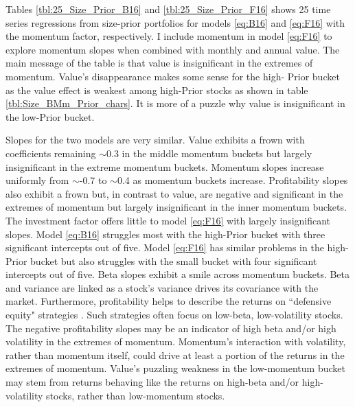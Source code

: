 
Tables \ref{tbl:25_Size_Prior_B16} and \ref{tbl:25_Size_Prior_F16} shows 25
time series regressions from size-prior portfolios for models \ref{eq:B16} and
\ref{eq:F16} with the momentum factor, respectively. I include momentum in
model \ref{eq:F16} to explore momentum slopes when combined with monthly and
annual value. The main message of the table is that value is insignificant in
the extremes of momentum. Value's disappearance makes some sense for the high-
Prior bucket as the value effect is weakest among high-Prior stocks as shown in
table \ref{tbl:Size_BMm_Prior_chars}. It is more of a puzzle why value is
insignificant in the low-Prior bucket.

Slopes for the two models are very similar. Value exhibits a frown with
coefficients remaining $\sim$0.3 in the middle momentum buckets but largely
insignificant in the extreme momentum buckets. Momentum slopes increase
uniformly from $\sim$-0.7 to $\sim$0.4 as momentum buckets increase.
Profitability slopes also exhibit a frown but, in contrast to value, are
negative and significant in the extremes of momentum but largely insignificant
in the inner momentum buckets. The investment factor offers little to model
\ref{eq:F16} with largely insignificant slopes. Model \ref{eq:B16} struggles
most with the high-Prior bucket with three significant intercepts out of five.
Model \ref{eq:F16} has similar problems in the high-Prior bucket but also
struggles with the small bucket with four significant intercepts out of five.
Beta slopes exhibit a smile across momentum buckets. Beta and variance are
linked as a stock's variance drives its covariance with the market.
Furthermore, profitability helps to describe the returns on ``defensive equity"
strategies \parencite{novy2014understanding}. Such strategies often focus on
low-beta, low-volatility stocks. The negative profitability slopes may be an
indicator of high beta and/or high volatility in the extremes of momentum.
Momentum's interaction with volatility, rather than momentum itself, could
drive at least a portion of the returns in the extremes of momentum.
Value's puzzling weakness in the low-momentum bucket may stem from returns
behaving like the returns on high-beta and/or high-volatility stocks,
rather than low-momentum stocks.

